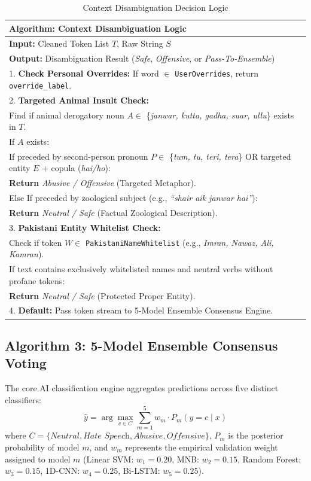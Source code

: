 \documentclass[A4paper,12pt]{report}
\theoremstyle{plain}
\theoremstyle{definition}
\theoremstyle{remark}
\numberwithin{equation}{section}
\begin{document}
\begin{table}[H]
\centering
\caption{Context Disambiguation Decision Logic}
\label{alg:context}
\renewcommand{\arraystretch}{1.3}
\begin{tabular}{|p{14.5cm}|}
\hline
\textbf{Algorithm: Context Disambiguation Logic} \\ \hline
\textbf{Input:} Cleaned Token List $T$, Raw String $S$ \\
\textbf{Output:} Disambiguation Result (\textit{Safe}, \textit{Offensive}, or \textit{Pass-To-Ensemble}) \\ \hline
1. \textbf{Check Personal Overrides:} If word $\in$ \texttt{UserOverrides}, return \texttt{override\_label}. \\
2. \textbf{Targeted Animal Insult Check:} \\
\quad Find if animal derogatory noun $A \in$ \{\textit{janwar, kutta, gadha, suar, ullu}\} exists in $T$. \\
\quad If $A$ exists: \\
\quad \quad If preceded by second-person pronoun $P \in$ \{\textit{tum, tu, teri, tera}\} OR targeted entity $E$ + copula (\textit{hai/ho}): \\
\quad \quad \quad \textbf{Return} \textit{Abusive / Offensive} (Targeted Metaphor). \\
\quad \quad Else If preceded by zoological subject (e.g., \textit{``shair aik janwar hai''}): \\
\quad \quad \quad \textbf{Return} \textit{Neutral / Safe} (Factual Zoological Description). \\
3. \textbf{Pakistani Entity Whitelist Check:} \\
\quad Check if token $W \in$ \texttt{PakistaniNameWhitelist} (e.g., \textit{Imran, Nawaz, Ali, Kamran}). \\
\quad If text contains exclusively whitelisted names and neutral verbs without profane tokens: \\
\quad \quad \textbf{Return} \textit{Neutral / Safe} (Protected Proper Entity). \\
4. \textbf{Default:} Pass token stream to 5-Model Ensemble Consensus Engine. \\ \hline
\end{tabular}
\end{table}

\subsection{Algorithm 3: 5-Model Ensemble Consensus Voting}
The core AI classification engine aggregates predictions across five distinct classifiers:
\begin{equation}
\hat{y} = \arg\max_{c \in C} \sum_{m=1}^{5} w_m \cdot P_m(y = c \mid x)
\end{equation}
where $C = \{\textit{Neutral}, \textit{Hate Speech}, \textit{Abusive}, \textit{Offensive}\}$, $P_m$ is the posterior probability of model $m$, and $w_m$ represents the empirical validation weight assigned to model $m$ (Linear SVM: $w_1 = 0.20$, MNB: $w_2 = 0.15$, Random Forest: $w_3 = 0.15$, 1D-CNN: $w_4 = 0.25$, Bi-LSTM: $w_5 = 0.25$).
\end{document}
